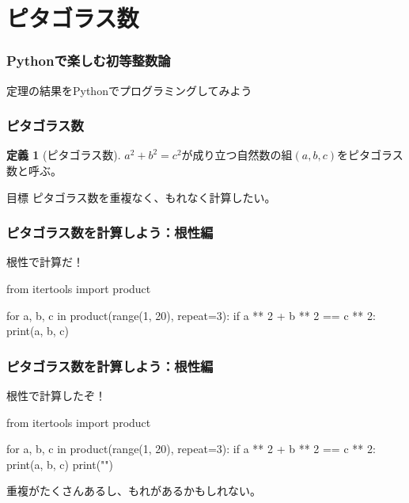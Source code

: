 \documentclass[dvipdfmx,11pt,notheorems]{beamer}
\theoremstyle{definition}
\newtheorem{theorem}{定理}
\newtheorem{definition}{定義}
\begin{document}
\section{ピタゴラス数}

\begin{frame}\frametitle{Pythonで楽しむ初等整数論}
\huge{定理の結果をPythonでプログラミングしてみよう}
\end{frame}

%
%

\begin{frame}\frametitle{ピタゴラス数}

\begin{definition}[ピタゴラス数]
$a^{2} + b^{2} = c^{2}$が成り立つ自然数の組$(a, b, c)$をピタゴラス数と呼ぶ。
\end{definition}

\begin{block}{目標}
ピタゴラス数を重複なく、もれなく計算したい。
\end{block}

\end{frame}

\begin{frame}[fragile]\frametitle{ピタゴラス数を計算しよう：根性編}

\begin{block}{根性で計算だ！}
\begin{pyverbatim}
from itertools import product

for a, b, c in product(range(1, 20), repeat=3):
    if a ** 2 + b ** 2 == c ** 2:
        print(a, b, c)
\end{pyverbatim}
\end{block}

\end{frame}

\begin{frame}[fragile]\frametitle{ピタゴラス数を計算しよう：根性編}

\begin{block}{根性で計算したぞ！}
\begin{pycode}
from itertools import product

for a, b, c in product(range(1, 20), repeat=3):
    if a ** 2 + b ** 2 == c ** 2:
        print(a, b, c)
        print("\n")
\end{pycode}
\end{block}

重複がたくさんあるし、もれがあるかもしれない。

\end{frame}
\end{document}
